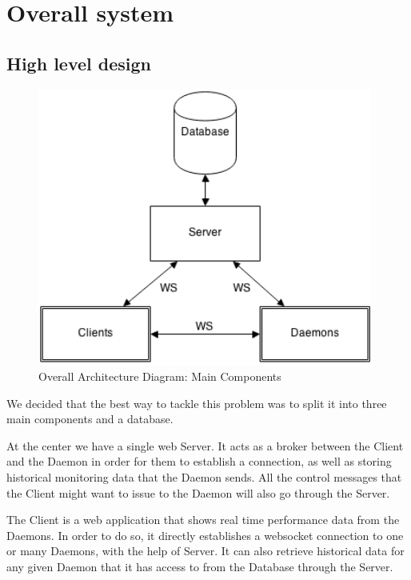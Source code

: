 \documentclass{l3proj}
\begin{document}

\section{Overall system}

\subsection{High level design}

\begin{figure}[H]
\centering
\includegraphics[width=110mm]{images/ArchitectureDiagram.png}
\caption{Overall Architecture Diagram: Main Components}
\end{figure}

We decided that the best way to tackle this problem was to split it into three main components and a database.

At the center we have a single web Server. It acts as a broker between the Client and the Daemon in order for them to establish a connection, as well as storing historical monitoring data that the Daemon sends. All the control messages that the Client might want to issue to the Daemon will also go through the Server.

The Client is a web application that shows real time performance data from the Daemons. In order to do so, it directly establishes a websocket connection to one or many Daemons, with the help of Server. It can also retrieve historical data for any given Daemon that it has access to from the Database through the Server.
\end{document}
